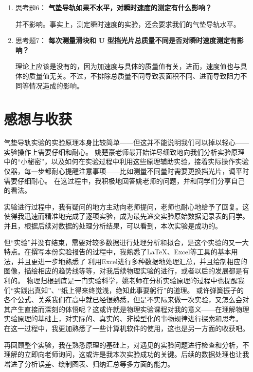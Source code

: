 \documentclass[11pt]{article}
\begin{document}
\begin{enumerate}
    \item 思考题6：  \textbf{气垫导轨如果不水平，对瞬时速度的测定有什么影响？}

并不影响。事实上，测定瞬时速度的实验，还会要求我们的气垫导轨水平。

    \item 思考题7：  \textbf{每次测量滑块和 U 型挡光片总质量不同是否对瞬时速度测定有影响？}

理论上应该是没有的，因为加速度与具体的质量值有关，进而，速度值也与具体的质量值无关。不过，不排除总质量不同导致表面积不同、进而导致阻力不同等情况造成的影响。

\end{enumerate}

\newpage
\section{感想与收获}

气垫导轨实验的实验原理本身比较简单——但这并不能说明我们可以掉以轻心——实验操作上需要仔细和耐心。
姚楚豪老师最开始详尽细致地向我们分析实验原理中的“小秘密”，以及如何在实验过程中利用这些原理辅助实验，接着实际操作实验仪器，每一步都耐心提醒注意事项——比如测量不同量时需要更换挡光片，调平时需要仔细耐心。
在这过程中，我积极地回答姚老师的问题，并和同学们分享自己的看法。

实验进行过程中，我有疑问的地方主动向老师提问，老师也耐心地给予了回复。这使得我迅速而精准地完成了逐项实验，成为最先递交实验原始数据记录表的同学。并且，根据后续对数据的处理分析结果，可以看到，本次实验是成功的。

但“实验”并没有结束，需要对较多数据进行处理分析和拟合，是这个实验的又一大特点。在撰写本份实验报告的过程中，我熟悉了\LaTeX、Excel等工具的基本用法，并且更进一步地熟悉了
利用Excel进行多种数据地处理汇总，并且绘制相应的图像，描绘相应的趋势线等等，对我后续物理实验的进行，或者以后的发展都是有利的。
物理归根到底是一门实验科学，姚老师在分析实验原理的过程中也提醒我们“实践出真知”、“纸上得来终觉浅，绝知此事要躬行”的道理。
或许弹簧振子的各个公式、关系我们在高中就已经很熟悉，但是不实际来做一次实验，又怎么会对其产生直接而深刻的体悟呢？这或许就是物理实验课程对我的意义——在理解物理实验原理的基础上，对实际的、真实的、非模型化的事物规律进行探索和思考。
在这一过程中，我更加熟悉了一些计算机软件的使用，这也是另一方面的收获吧。

再回顾整个实验，我在熟悉原理的基础上，对遇见的实验问题进行检查和分析，不理解的立即向老师询问，这或许是我本次实验成功的关键。后续的数据处理也让我增进了分析误差、绘制图表、归纳汇总等多方面的能力。
\end{document}
